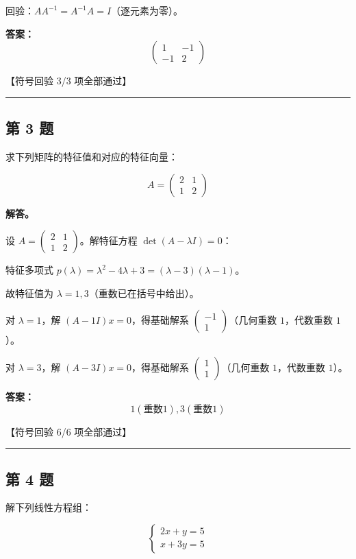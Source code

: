 \documentclass[12pt, a4paper]{article}
\newcommand{\problem}[1]{\subsection*{第 #1 题}}
\newcommand{\solution}{\textbf{解答。}}
\begin{document}
回验：$A A^{-1} = A^{-1} A = I$（逐元素为零）。

\textbf{答案：}
{\small
\[\begin{pmatrix} 1 & -1 \\ -1 & 2 \end{pmatrix}\]
}

\textcolor{okgreen}{【符号回验 3/3 项全部通过】}

\vspace{0.8em}
\hrule
\vspace{0.8em}

\problem{3}

求下列矩阵的特征值和对应的特征向量：

$$
A = \begin{pmatrix} 2 & 1 \\ 1 & 2 \end{pmatrix}
$$

\solution

设 $A = \begin{pmatrix} 2 & 1 \\ 1 & 2 \end{pmatrix}$。解特征方程 $\det(A - \lambda I) = 0$：

特征多项式 $p(\lambda) = \lambda^{2} - 4 \lambda + 3 = \left(\lambda - 3\right) \left(\lambda - 1\right)$。

故特征值为 $\lambda = 1, 3$（重数已在括号中给出）。

对 $\lambda = 1$，解 $(A - 1I)x = 0$，得基础解系 $\begin{pmatrix} -1 \\ 1 \end{pmatrix}$（几何重数 $1$，代数重数 $1$）。

对 $\lambda = 3$，解 $(A - 3I)x = 0$，得基础解系 $\begin{pmatrix} 1 \\ 1 \end{pmatrix}$（几何重数 $1$，代数重数 $1$）。

\textbf{答案：}
\[\boxed{1(重数1), 3(重数1)}\]

\textcolor{okgreen}{【符号回验 6/6 项全部通过】}

\vspace{0.8em}
\hrule
\vspace{0.8em}

\problem{4}

解下列线性方程组：

$$
\begin{cases}
2x + y = 5 \\
x + 3y = 5
\end{cases}
$$
\end{document}
